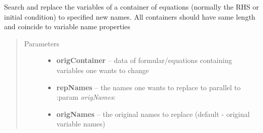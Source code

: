 \documentclass[letterpaper,10pt,english]{sphinxmanual}
\begin{document}
\begin{fulllineitems}

\begin{fulllineitems}
\label{eqparse:eqparse.baseparse.BaseParse.replace_operations}
\end{fulllineitems}


\begin{fulllineitems}
\label{eqparse:eqparse.baseparse.BaseParse.search_and_replace}
Search and replace the variables of a container of equations (normally the 
RHS or initial condition) to specified new names. All containers
should have same length and coincide to variable  name properties
\begin{quote}\begin{description}
\item[{Parameters}] \leavevmode\begin{itemize}
\item {} 
\textbf{origContainer} -- data of formular/equations containing variables one wants to change

\item {} 
\textbf{repNames} -- the names one wants to replace to parallel to :param \emph{origNames}:

\item {} 
\textbf{origNames} -- the original names to replace (default - original variable names)

\end{itemize}

\end{description}\end{quote}

\end{fulllineitems}


\begin{fulllineitems}
\label{eqparse:eqparse.baseparse.BaseParse.vectorise_name}
\end{fulllineitems}


\end{fulllineitems}
\end{document}
